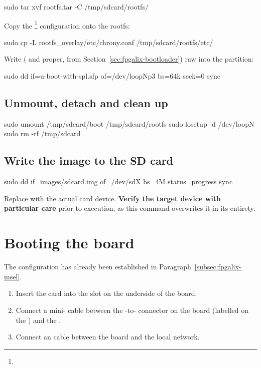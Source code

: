 \begin{shellcodehost}
sudo tar xvf rootfs.tar -C /tmp/sdcard/rootfs/
\end{shellcodehost}

Copy the \footnote{} configuration onto the rootfs:

\begin{shellcodehost}
sudo cp -L rootfs_overlay/etc/chrony.conf /tmp/sdcard/rootfs/etc/
\end{shellcodehost}

Write  ( and  proper, from Section~\ref{sec:fpgalix-bootloader}) raw into the  partition:

\begin{shellcodehost}
sudo dd if=u-boot-with-spl.sfp of=/dev/loopNp3 bs=64k seek=0
sync
\end{shellcodehost}

\subsection{Unmount, detach and clean up}

\begin{shellcodehost}
sudo umount /tmp/sdcard/boot /tmp/sdcard/rootfs
sudo losetup -d /dev/loopN
sudo rm -rf /tmp/sdcard
\end{shellcodehost}

\subsection{Write the image to the SD card}

\begin{shellcodehost}
sudo dd if=images/sdcard.img of=/dev/sdX bs=4M status=progress
sync
\end{shellcodehost}

Replace  with the actual  card device. \textbf{Verify the target device with particular care} prior to execution, as this command overwrites it in its entirety.

\section{Booting the board}

The  configuration has already been established in Paragraph~\ref{subsec:fpgalix-msel}.

\begin{enumerate}
    \item Insert the  card into the slot on the underside of the board.
    \item Connect a mini- cable between the -to- connector on the board (labelled on the ) and the .
    \item Connect an  cable between the board and the local network.
\end{enumerate}

